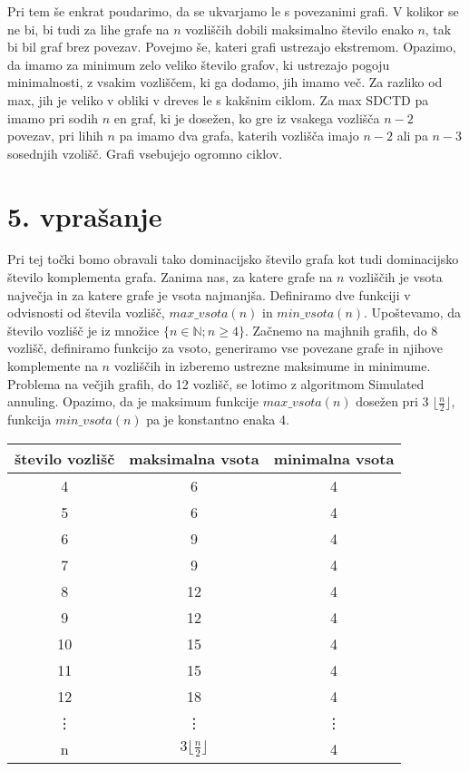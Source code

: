 \documentclass[12pt]{article}
\begin{document}
\noindent Pri tem še enkrat poudarimo, da se ukvarjamo le s povezanimi grafi. V kolikor se ne bi, bi tudi za lihe grafe na $n$ vozliščih dobili maksimalno število enako $n$, tak bi bil graf brez povezav.
Povejmo še, kateri grafi ustrezajo ekstremom. Opazimo, da imamo za minimum zelo veliko število grafov, ki ustrezajo pogoju minimalnosti, z vsakim vozliščem, ki ga dodamo, jih imamo več. Za razliko od max, jih je veliko v obliki v dreves le s kakšnim ciklom. Za max SDCTD pa imamo pri sodih $n$ en graf, ki je dosežen, ko gre iz vsakega vozlišča $n - 2$ povezav, pri lihih $n$ pa imamo dva grafa, katerih vozlišča imajo $n - 2$ ali pa $n - 3$ sosednjih vzolišč. Grafi vsebujejo ogromno ciklov.

\section{5. vprašanje}
Pri tej točki bomo obravali tako dominacijsko število grafa kot tudi dominacijsko število komplementa grafa. Zanima nas, za katere grafe na $n$ vozliščih je vsota največja in za katere grafe je vsota najmanjša. Definiramo dve funkciji v odvisnosti od števila vozlišč, $max\_vsota(n)$ in $min\_vsota(n)$. Upoštevamo, da število vozlišč je iz množice $\{n \in \mathbb{N}; n \geq 4\}$.
Začnemo na majhnih grafih, do 8 vozlišč, definiramo funkcijo za vsoto, generiramo vse povezane grafe in njihove komplemente na $n$ vozliščih in izberemo ustrezne maksimume in minimume. Problema na večjih grafih, do 12 vozlišč,
se lotimo z algoritmom Simulated annuling.
Opazimo, da je maksimum funkcije $max\_vsota(n)$ dosežen pri 3 $\lfloor \frac{n}{2} \rfloor$, funkcija $min\_vsota(n) $ pa je konstantno enaka 4.


\begin{center}
    \begin{tabular}{|c|c|c|} 
     \hline
     število vozlišč & maksimalna vsota & minimalna vsota \\ [0.5ex] 
     \hline 
     4 & 6 & 4 \\
     \hline
     5 & 6 & 4 \\
     \hline 
     6 & 9 & 4 \\ 
     \hline
     7 & 9 & 4 \\
     \hline
     8 & 12 & 4 \\
     \hline
     9 & 12 & 4 \\
     \hline
     10 & 15 & 4 \\  
     \hline
     11 & 15 & 4 \\
     \hline
     12 & 18 & 4 \\  
     \hline
     \vdots & \vdots & \vdots \\  
     \hline
     n & $ 3 \lfloor \frac{n}{2} \rfloor$ & 4 \\ [1ex] 
     \hline
    \end{tabular}
\end{center}
\end{document}
